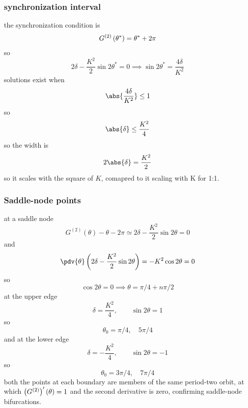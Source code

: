 \subsubsection{synchronization interval}
the synchronization condition is 
\begin{equation}
    G^{(2)}\left(\theta^*\right)=\theta^*+2\pi
\end{equation}
so 
\begin{equation}
    2\delta-\frac{K^2}{2}\sin2\theta^*=0 \implies \sin2\theta^*=\frac{4\delta}{K^2}
\end{equation}
solutions exist when 
\begin{equation}
    \abs{\frac{4\delta}{K^2}}\leq 1
\end{equation}
so 
\begin{equation}
    \abs{\delta}\leq\frac{K^2}{4}
\end{equation}
so the width is 
\begin{equation}
    2\abs{\delta}=\frac{K^2}{2}
\end{equation}
so it scales with the square of \(K\), comapred to it scaling with K for 1:1.
\subsubsection{Saddle-node points}
at a saddle node 
\begin{equation}
    G^{(2)}(\theta)-\theta-2\pi\simeq2\delta-\frac{K^2}{2}\sin2\theta=0
\end{equation}
and 
\begin{equation}
    \pdv{\theta}\ins{2\delta-\frac{K^2}{2}\sin2\theta}=-K^2\cos2\theta=0
\end{equation}
so
\begin{equation}
    \cos2\theta=0\implies\theta=\pi/4+n\pi/2
\end{equation}
at the upper edge 
\begin{equation}
    \delta = \frac{K^2}{4},\qquad \sin2\theta=1
\end{equation}
so 
\begin{equation}
    \theta_0=\pi/4,\quad5\pi/4
\end{equation}
and at the lower edge 
\begin{equation}
    \delta=-\frac{K^2}{4},\qquad\sin2\theta=-1
\end{equation}
so 
\begin{equation}
    \theta_0=3\pi/4,\quad7\pi/4
\end{equation}
both the points at each boundary are members of the same period-two orbit, at which \(\left(G^{(2)}\right)'(\theta)=1\) and the second derivative is zero, confirming saddle-node bifurcations.
